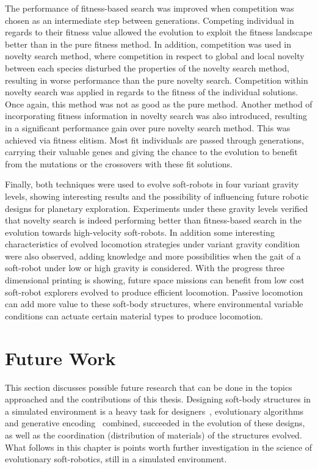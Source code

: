 The performance of fitness-based search was improved when competition was chosen as an intermediate step between generations. Competing individual in regards to their fitness value allowed the evolution to exploit the fitness landscape better than in the pure fitness method. In addition, competition was used in novelty search method, where competition in respect to global and local novelty between each species disturbed the properties of the novelty search method, resulting in worse performance than the pure novelty search. Competition within novelty search was applied in regards to the fitness of the individual solutions. Once again, this method was not as good as the pure method. Another method of incorporating fitness information in novelty search was also introduced, resulting in a significant performance gain over pure novelty search method. This was achieved via fitness elitism. Most fit individuals are passed through generations, carrying their valuable genes and giving the chance to the evolution to benefit from the mutations or the crossovers with these fit solutions. 

Finally, both techniques were used to evolve soft-robots in four variant gravity levels, showing interesting results and the possibility of influencing future robotic designs for planetary exploration. Experiments under these gravity levels verified that novelty search is indeed performing better than fitness-based search in the evolution towards high-velocity soft-robots. In addition some interesting characteristics of evolved locomotion strategies under variant gravity condition were also observed, adding knowledge and more possibilities when the gait of a soft-robot under low or high gravity is considered. With the progress three dimensional printing is showing, future space missions can benefit from low cost soft-robot explorers evolved to produce efficient locomotion. Passive locomotion can add more value to these soft-body structures, where environmental variable conditions can actuate certain material types to produce locomotion.

\section{Future Work} %

This section discusses possible future research that can be done in the topics approached and the contributions of this thesis. Designing soft-body structures in a simulated environment is a heavy task for designers~\citep{cheney2013unshackling}, evolutionary algorithms~\citep{stanley2002evolving} and generative encoding~\citep{stanley2007compositional} combined, succeeded in the evolution of these designs, as well as the coordination (distribution of materials) of the structures evolved. What follows in this chapter is points worth further investigation in the science of evolutionary soft-robotics, still in a simulated environment.

